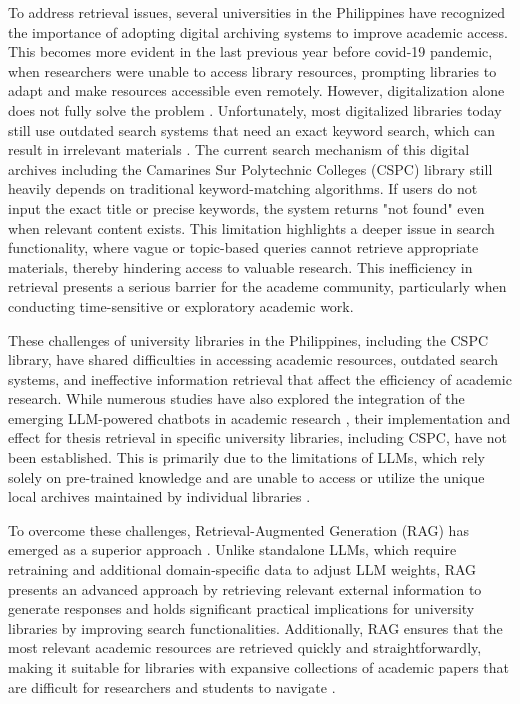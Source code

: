\begin{refsection}
\bigbreak
To address retrieval issues, several universities in the Philippines have recognized the importance of adopting digital archiving systems to improve academic access. This becomes more evident in the last previous year before covid-19 pandemic, when researchers were unable to access library resources, prompting libraries to adapt and make resources accessible even remotely. However, digitalization alone does not fully solve the problem \cite{aydin2021comparing, lagas2023challenges, prajapat2022comparative}. Unfortunately, most digitalized libraries today still use outdated search systems that need an exact keyword search, which can result in irrelevant materials \cite{setiyani2023increasing}. The current search mechanism of this digital archives including the Camarines Sur Polytechnic Colleges (CSPC) library still heavily depends on traditional keyword-matching algorithms. If users do not input the exact title or precise keywords, the system returns "not found" even when relevant content exists. This limitation highlights a deeper issue in search functionality, where vague or topic-based queries cannot retrieve appropriate materials, thereby hindering access to valuable research. This inefficiency in retrieval presents a serious barrier for the academe community,  particularly when conducting time-sensitive or exploratory academic work.

\bigbreak
These challenges of university libraries in the Philippines, including the CSPC library, have shared difficulties in accessing academic resources, outdated search systems, and ineffective information retrieval that affect the efficiency of academic research. While numerous studies have also explored the integration of the emerging LLM-powered chatbots in academic research \cite{aboelmaged2024conversational}, their implementation and effect for thesis retrieval in specific university libraries, including CSPC, have not been established. This is primarily due to the limitations of LLMs, which rely solely on pre-trained knowledge and are unable to access or utilize the unique local archives maintained by individual libraries \cite{bommasani2021opportunities, strich2024improving}.

\bigbreak
To overcome these challenges, Retrieval-Augmented Generation (RAG) has emerged as a superior approach \cite{lewis2020retrieval}. Unlike standalone LLMs, which require retraining and additional domain-specific data to adjust LLM weights, RAG presents an advanced approach by retrieving relevant external information to generate responses and holds significant practical implications for university libraries by improving search functionalities. Additionally, RAG ensures that the most relevant academic resources are retrieved quickly and straightforwardly, making it suitable for libraries with expansive collections of academic papers that are difficult for researchers and students to navigate \cite{wang2024mememo, huang2023retrieval}.


\end{refsection}
